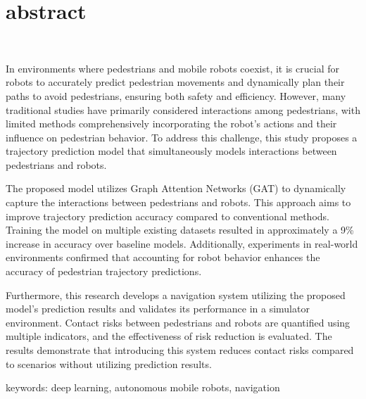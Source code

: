 \chapter*{abstract}
\thispagestyle{empty}
%
\vspace{-30pt}
\begin{center}
  \scalebox{1.2}{Pedestrian Position Prediction Using Deep Learning for Mobile Robot}\\
  \scalebox{1.2}{and Its Application to Navigation}
\end{center}
\vspace{1.0zh}
%
In environments where pedestrians and mobile robots coexist, it is crucial for robots to accurately predict pedestrian movements and dynamically plan their paths to avoid pedestrians, ensuring both safety and efficiency. However, many traditional studies have primarily considered interactions among pedestrians, with limited methods comprehensively incorporating the robot's actions and their influence on pedestrian behavior. To address this challenge, this study proposes a trajectory prediction model that simultaneously models interactions between pedestrians and robots.

The proposed model utilizes Graph Attention Networks (GAT) to dynamically capture the interactions between pedestrians and robots. This approach aims to improve trajectory prediction accuracy compared to conventional methods. Training the model on multiple existing datasets resulted in approximately a 9\% increase in accuracy over baseline models. Additionally, experiments in real-world environments confirmed that accounting for robot behavior enhances the accuracy of pedestrian trajectory predictions.

Furthermore, this research develops a navigation system utilizing the proposed model's prediction results and validates its performance in a simulator environment. Contact risks between pedestrians and robots are quantified using multiple indicators, and the effectiveness of risk reduction is evaluated. The results demonstrate that introducing this system reduces contact risks compared to scenarios without utilizing prediction results.

\begin{flushleft}
keywords: deep learning, autonomous mobile robots, navigation
\end{flushleft}